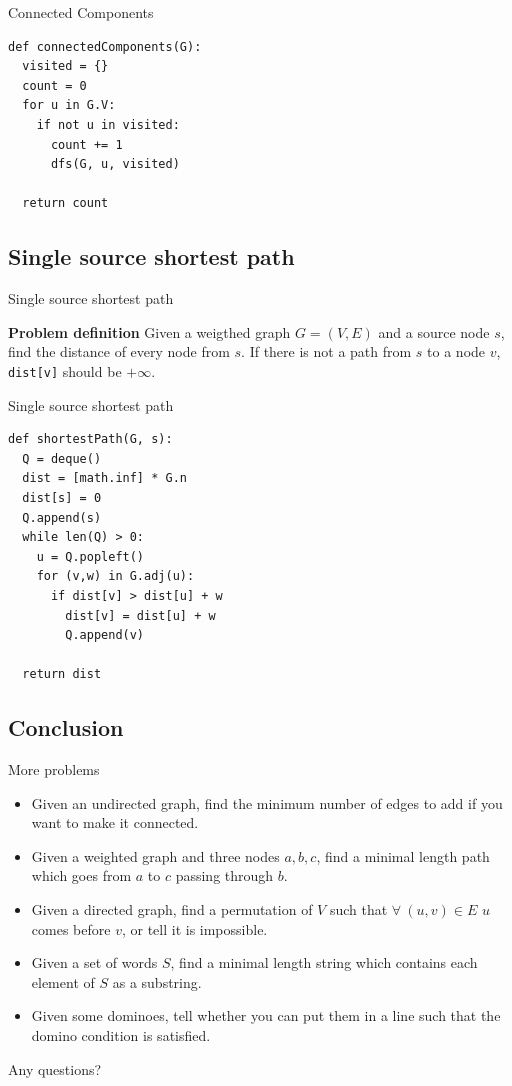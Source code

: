 \documentclass[compress]{beamer}
\begin{document}
\begin{frame}[fragile]{Connected Components}
\begin{lstlisting}
def connectedComponents(G):
  visited = {}
  count = 0
  for u in G.V:
    if not u in visited:
      count += 1
      dfs(G, u, visited)

  return count
\end{lstlisting}
\end{frame}

\subsection{Single source shortest path}
\begin{frame}{Single source shortest path}
  \begin{block}{\textbf{Problem definition}}
    Given a weigthed graph $G = (V, E)$ and a source node $s$, find the distance of every node from $s$. If there is not a path from $s$ to a node $v$, \texttt{dist[v]} should be $+\infty$.
  \end{block}
  \begin{center}
  
  \end{center}
\end{frame}

\begin{frame}[fragile]{Single source shortest path}
\begin{lstlisting}
def shortestPath(G, s):
  Q = deque()
  dist = [math.inf] * G.n
  dist[s] = 0
  Q.append(s)
  while len(Q) > 0:
    u = Q.popleft()
    for (v,w) in G.adj(u):
      if dist[v] > dist[u] + w
        dist[v] = dist[u] + w
        Q.append(v)

  return dist
\end{lstlisting}
\end{frame}

\subsection{Conclusion}

\begin{frame}{More problems}
  \begin{itemize}
  \item Given an undirected graph, find the minimum number of edges to add if you want to make it connected.
  \item Given a weighted graph and three nodes $a, b, c$, find a minimal length path which goes from $a$ to $c$ passing through $b$.
  \item Given a directed graph, find a permutation of $V$ such that $\forall \ (u,v) \in E$ $u$ comes before $v$, or tell it is impossible.
  \item Given a set of words $S$, find a minimal length string which contains each element of $S$ as a substring.
  \item Given some dominoes, tell whether you can put them in a line such that the domino condition is satisfied.
  \end{itemize}
\end{frame}

\begin{frame}{Any questions?}
  \tableofcontents
\end{frame}
\end{document}
